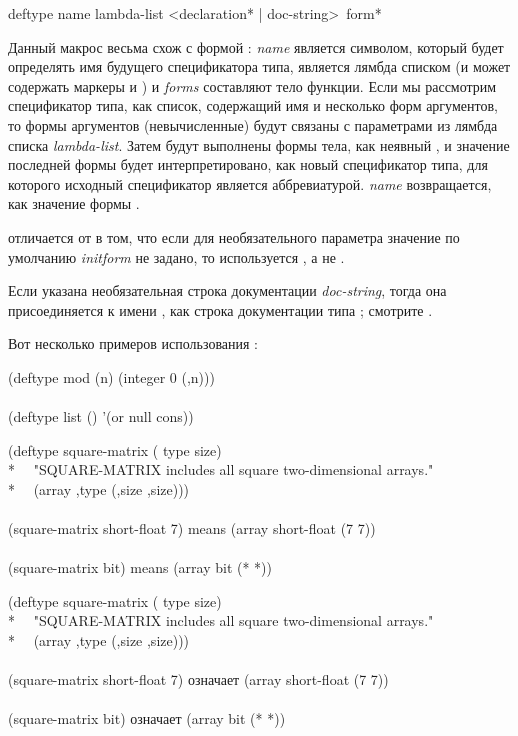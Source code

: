 \begin{defmac}
deftype name lambda-list <{declaration}* | doc-string> {\,form}*

Данный макрос весьма схож с формой : \emph{name} является
символом, который будет определять имя будущего спецификатора типа,
 является лямбда списком (и может содержать маркеры  и
) и \emph{forms} составляют тело функции. Если мы рассмотрим
спецификатор типа, как список, содержащий имя и несколько форм аргументов, то
формы аргументов (невычисленные) будут связаны с параметрами из лямбда списка
\emph{lambda-list}. Затем будут выполнены формы тела, как неявный ,
и значение последней формы будет интерпретировано, как новый спецификатор типа,
для которого исходный спецификатор является аббревиатурой. \emph{name}
возвращается, как значение формы .

 отличается от  в том, что если для необязательного 
параметра значение по умолчанию \emph{initform} не задано, то используется
\cdf{*}, а не {\nil}.

Если указана необязательная строка документации \emph{doc-string}, тогда она
присоединяется к имени , как строка документации типа ;
смотрите .

Вот несколько примеров использования :
\begin{lisp}
(deftype mod (n) {\Xbq}(integer 0 (,n))) \\
 \\
(deftype list () '(or null cons))
\end{lisp}

\begin{lisp}
(deftype square-matrix ( type size) \\*
~~"SQUARE-MATRIX includes all square two-dimensional arrays." \\*
~~{\Xbq}(array ,type (,size ,size))) \\
 \\
(square-matrix short-float 7)  \textrm{means}  (array short-float (7 7)) \\
 \\
(square-matrix bit)  \textrm{means}  (array bit (* *))
\end{lisp}

\begin{lisp}
(deftype square-matrix ( type size) \\*
~~"SQUARE-MATRIX includes all square two-dimensional arrays." \\*
~~{\Xbq}(array ,type (,size ,size))) \\
 \\
(square-matrix short-float 7)  \textrm{означает}  (array short-float (7 7)) \\
 \\
(square-matrix bit)  \textrm{означает}  (array bit (* *))
\end{lisp}


\end{defmac}
